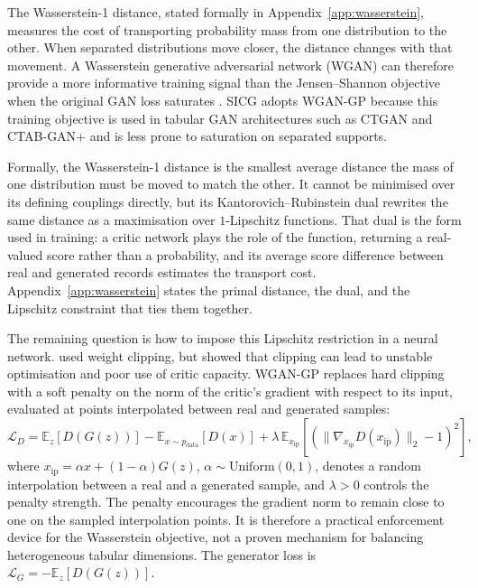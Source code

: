 The Wasserstein-1 distance, stated formally in Appendix~\ref{app:wasserstein}, measures the cost of transporting probability mass from one distribution to the other. When separated distributions move closer, the distance changes with that movement. A Wasserstein generative adversarial network (WGAN) can therefore provide a more informative training signal than the Jensen--Shannon objective when the original GAN loss saturates \citep{arjovsky2017wasserstein}. SICG adopts WGAN-GP because this training objective is used in tabular GAN architectures such as CTGAN and CTAB-GAN+ and is less prone to saturation on separated supports.

Formally, the Wasserstein-1 distance is the smallest average distance the mass of one distribution must be moved to match the other. It cannot be minimised over its defining couplings directly, but its Kantorovich--Rubinstein dual rewrites the same distance as a maximisation over $1$-Lipschitz functions. That dual is the form used in training: a critic network plays the role of the function, returning a real-valued score rather than a probability, and its average score difference between real and generated records estimates the transport cost. Appendix~\ref{app:wasserstein} states the primal distance, the dual, and the Lipschitz constraint that ties them together.

The remaining question is how to impose this Lipschitz restriction in a neural network. \citet{arjovsky2017wasserstein} used weight clipping, but \citet{gulrajani2017improved} showed that clipping can lead to unstable optimisation and poor use of critic capacity. WGAN-GP replaces hard clipping with a soft penalty on the norm of the critic's gradient with respect to its input, evaluated at points interpolated between real and generated samples:
\begin{equation}
\mathcal{L}_D = \mathbb{E}_{z}[D(G(z))] - \mathbb{E}_{x \sim p_{\text{data}}}[D(x)] + \lambda \, \mathbb{E}_{x_{\text{ip}}}[(\|\nabla_{x_{\text{ip}}} D(x_{\text{ip}})\|_2 - 1)^2],
\label{eq:wgan-gp}
\end{equation}
where \(x_{\text{ip}}=\alpha x+(1-\alpha)G(z)\), \(\alpha\sim\mathrm{Uniform}(0,1)\), denotes a random interpolation between a real and a generated sample, and \(\lambda>0\) controls the penalty strength. The penalty encourages the gradient norm to remain close to one on the sampled interpolation points. It is therefore a practical enforcement device for the Wasserstein objective, not a proven mechanism for balancing heterogeneous tabular dimensions. The generator loss is \(\mathcal{L}_G=-\mathbb{E}_z[D(G(z))]\).

